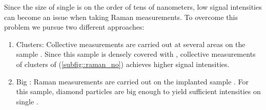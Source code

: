 			Since the size of single \nds is on the order of tens of nanometers, low signal intensities can become an issue when taking Raman measurements.
			To overcome this problem we pursue two different approaches:
			\begin{enumerate}[label=\alph*),ref=\alph*)]
				\item \Nd Clusters: \label{item::raman_gband} Collective measurements are carried out at several areas on the sample \insituS. Since this sample is densely covered with \nds, collective measurements of clusters of \nds (\cref{subfig::raman_no}) achieves higher signal intensities.
				\item Big \Nds: \label{item::raman_implanted} Raman measurements are carried out on the implanted sample \implantedTao. For this sample, diamond particles are big enough to yield sufficient intensities on single \nds.
			\end{enumerate}

